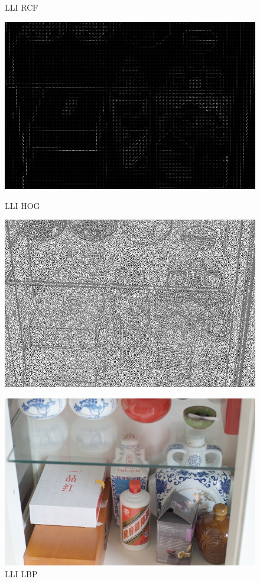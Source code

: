 \documentclass[CJK,aspectratio=169]{beamer}  %
\begin{document}
\begin{frame}
\begin{figure}
\begin{minipage}{.19\textwidth}
				\captionsetup{font=scriptsize}
				\label{fig: LLI_rcf}	
				\caption*{LLI RCF}
			\end{minipage}
			\begin{minipage}{.19\textwidth}
				\centering
				\includegraphics[width=.8\linewidth]{picture/LLIE/My Architecture/Edge Detection/low00044_hog}
				\captionsetup{font=scriptsize}
				\label{fig: LLI_hog}	
				\caption*{LLI HOG}
			\end{minipage}
			\begin{minipage}{.19\textwidth}
				\centering
				\includegraphics[width=.8\linewidth]{picture/LLIE/My Architecture/Edge Detection/low00044_lbp}
				\captionsetup{font=scriptsize}
				\label{fig: LLI_lbp}	
				\caption*{LLI LBP}
			\end{minipage}
			\begin{minipage}{.19\textwidth}
				\centering
				\includegraphics[width=.8\linewidth]{picture/LLIE/My Architecture/Edge Detection/normal00044}

\end{minipage}
\end{figure}
\end{frame}
\end{document}

